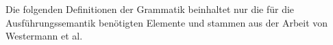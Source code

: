     Die folgenden Definitionen der Grammatik beinhaltet nur die für die Ausführungssemantik benötigten Elemente \cite{99} und stammen aus der Arbeit von Westermann et al.
